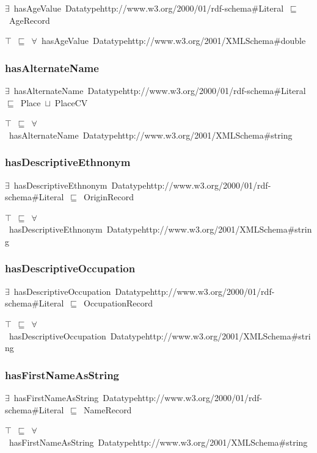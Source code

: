 \documentclass{article}
\begin{document}
\ensuremath{\exists}~hasAgeValue~Datatypehttp://www.w3.org/2000/01/rdf-schema#Literal~\ensuremath{\sqsubseteq}~AgeRecord

\ensuremath{\top}~\ensuremath{\sqsubseteq}~\ensuremath{\forall}~hasAgeValue~Datatypehttp://www.w3.org/2001/XMLSchema#double

\subsubsection*{hasAlternateName}

\ensuremath{\exists}~hasAlternateName~Datatypehttp://www.w3.org/2000/01/rdf-schema#Literal~\ensuremath{\sqsubseteq}~Place~\ensuremath{\sqcup}~PlaceCV

\ensuremath{\top}~\ensuremath{\sqsubseteq}~\ensuremath{\forall}~hasAlternateName~Datatypehttp://www.w3.org/2001/XMLSchema#string

\subsubsection*{hasDescriptiveEthnonym}

\ensuremath{\exists}~hasDescriptiveEthnonym~Datatypehttp://www.w3.org/2000/01/rdf-schema#Literal~\ensuremath{\sqsubseteq}~OriginRecord

\ensuremath{\top}~\ensuremath{\sqsubseteq}~\ensuremath{\forall}~hasDescriptiveEthnonym~Datatypehttp://www.w3.org/2001/XMLSchema#string

\subsubsection*{hasDescriptiveOccupation}

\ensuremath{\exists}~hasDescriptiveOccupation~Datatypehttp://www.w3.org/2000/01/rdf-schema#Literal~\ensuremath{\sqsubseteq}~OccupationRecord

\ensuremath{\top}~\ensuremath{\sqsubseteq}~\ensuremath{\forall}~hasDescriptiveOccupation~Datatypehttp://www.w3.org/2001/XMLSchema#string

\subsubsection*{hasFirstNameAsString}

\ensuremath{\exists}~hasFirstNameAsString~Datatypehttp://www.w3.org/2000/01/rdf-schema#Literal~\ensuremath{\sqsubseteq}~NameRecord

\ensuremath{\top}~\ensuremath{\sqsubseteq}~\ensuremath{\forall}~hasFirstNameAsString~Datatypehttp://www.w3.org/2001/XMLSchema#string
\end{document}
